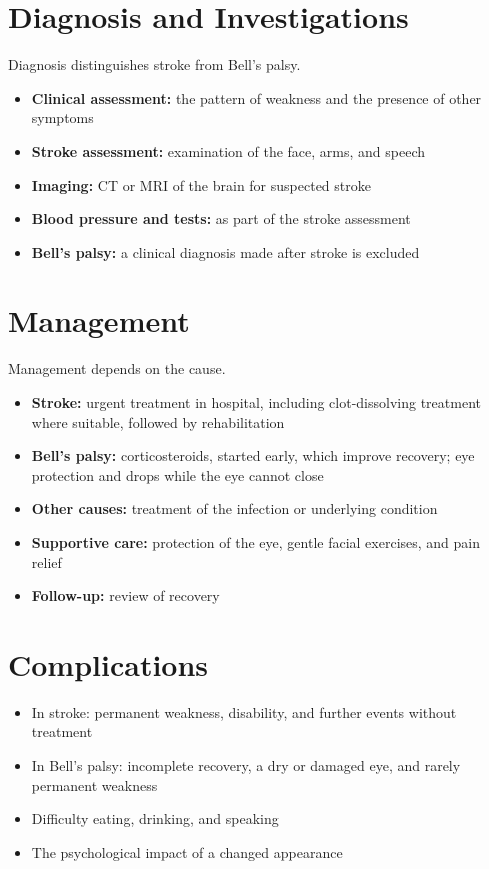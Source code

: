 \section*{Diagnosis and Investigations}
Diagnosis distinguishes stroke from Bell's palsy.
\begin{itemize}
    \item \textbf{Clinical assessment:} the pattern of weakness and the presence of other symptoms
    \item \textbf{Stroke assessment:} examination of the face, arms, and speech
    \item \textbf{Imaging:} CT or MRI of the brain for suspected stroke
    \item \textbf{Blood pressure and tests:} as part of the stroke assessment
    \item \textbf{Bell's palsy:} a clinical diagnosis made after stroke is excluded
\end{itemize}

\section*{Management}
Management depends on the cause.
\begin{itemize}
    \item \textbf{Stroke:} urgent treatment in hospital, including clot-dissolving treatment where suitable, followed by rehabilitation
    \item \textbf{Bell's palsy:} corticosteroids, started early, which improve recovery; eye protection and drops while the eye cannot close
    \item \textbf{Other causes:} treatment of the infection or underlying condition
    \item \textbf{Supportive care:} protection of the eye, gentle facial exercises, and pain relief
    \item \textbf{Follow-up:} review of recovery
\end{itemize}

\section*{Complications}
\begin{itemize}
    \item In stroke: permanent weakness, disability, and further events without treatment
    \item In Bell's palsy: incomplete recovery, a dry or damaged eye, and rarely permanent weakness
    \item Difficulty eating, drinking, and speaking
    \item The psychological impact of a changed appearance
\end{itemize}

